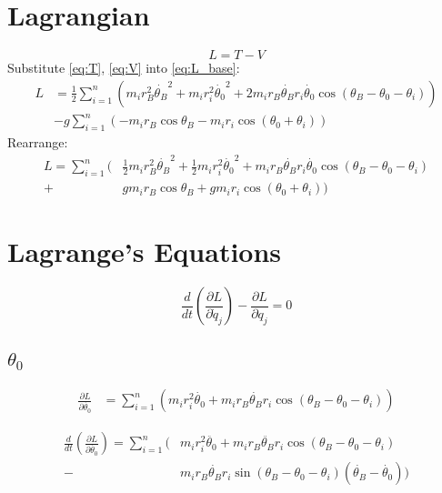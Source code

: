 \documentclass[titlepage]{article}
\numberwithin{equation}{section}
\begin{document}
\section{Lagrangian}
\begin{equation} \label{eq:L_base}
L = T - V
\end{equation}
Substitute \ref{eq:T}, \ref{eq:V} into \ref{eq:L_base}:
\begin{align}
L &= \frac{1}{2} \sum_{i=1}^{n}(
         m_i r_B^2 \dot{\theta_B}^2 + m_i r_i^2 \dot{\theta_0}^2
       + 2 m_i r_B \dot{\theta_B} r_i \dot{\theta_0} \cos(\theta_B - \theta_0 - \theta_i)
     ) \nonumber \\
  &- g \sum_{i=1}^{n}(-m_i r_B \cos \theta_B - m_i r_i \cos{(\theta_0 + \theta_i)})
\end{align}
Rearrange:
\begin{align}
L = \sum_{i=1}^{n}(
        &\frac{1}{2} m_i r_B^2 \dot{\theta_B}^2
      + \frac{1}{2} m_i r_i^2 \dot{\theta_0}^2
      + m_i r_B \dot{\theta_B} r_i \dot{\theta_0} \cos(\theta_B - \theta_0 - \theta_i) \nonumber \\
      + &g m_i r_B \cos \theta_B + g m_i r_i \cos{(\theta_0 + \theta_i)}
    )
\end{align}

\section{Lagrange's Equations}
\begin{equation} \label{eq:LE_base}
\frac{d}{dt} \left(\frac{\partial L}{\partial \dot{q}_j}\right) - \frac{\partial L}{\partial q_j} = 0
\end{equation}

\pagebreak
\subsection{$\theta_0$}
\begin{align}
\frac{\partial L}{\partial \dot{\theta_0}} &= 
    \sum_{i=1}^{n}(
        m_i r_i^2 \dot{\theta_0}
      + m_i r_B \dot{\theta_B} r_i \cos{(\theta_B - \theta_0 - \theta_i)}
    )
\end{align}

\begin{align}
\frac{d}{dt} \left(\frac{\partial L}{\partial \dot{\theta_0}}\right) =
    \sum_{i=1}^{n}(
        &m_i r_i^2 \ddot{\theta_0}
      + m_i r_B \ddot{\theta_B} r_i \cos{(\theta_B - \theta_0 - \theta_i)} \nonumber \\
      - &m_i r_B \dot{\theta_B} r_i \sin{(\theta_B - \theta_0 - \theta_i)} (\dot{\theta_B} - \dot{\theta_0})    ) \label{eq:LE_left_t0}
\end{align}
\end{document}
